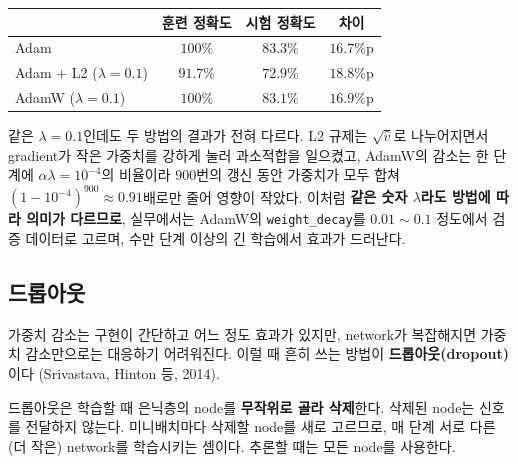 \documentclass[11pt,a4paper]{article}
\begin{document}
\begin{center}
\begin{tabular}{@{}lccc@{}}
\toprule
& 훈련 정확도 & 시험 정확도 & 차이 \\
\midrule
Adam & $100\%$ & $83.3\%$ & $16.7\%$p \\
Adam $+$ L2 ($\lambda=0.1$) & $91.7\%$ & $72.9\%$ & $18.8\%$p \\
AdamW ($\lambda=0.1$) & $100\%$ & $83.1\%$ & $16.9\%$p \\
\bottomrule
\end{tabular}
\end{center}
같은 $\lambda=0.1$인데도 두 방법의 결과가 전혀 다르다.
L2 규제는 $\sqrt{\hat v}$로 나누어지면서 gradient가 작은 가중치를 강하게 눌러 과소적합을 일으켰고,
AdamW의 감소는 한 단계에 $\alpha\lambda=10^{-4}$의 비율이라 $900$번의 갱신 동안
가중치가 모두 합쳐 $(1-10^{-4})^{900}\approx0.91$배로만 줄어 영향이 작았다.
이처럼 \textbf{같은 숫자 $\lambda$라도 방법에 따라 의미가 다르므로}, 실무에서는 AdamW의 \texttt{weight\_decay}를
$0.01\sim0.1$ 정도에서 검증 데이터로 고르며, 수만 단계 이상의 긴 학습에서 효과가 드러난다.

\subsection{드롭아웃}\label{sec:dropout}

가중치 감소는 구현이 간단하고 어느 정도 효과가 있지만,
network가 복잡해지면 가중치 감소만으로는 대응하기 어려워진다.
이럴 때 흔히 쓰는 방법이 \textbf{드롭아웃(dropout)}이다 (Srivastava, Hinton 등, 2014).

드롭아웃은 학습할 때 은닉층의 node를 \textbf{무작위로 골라 삭제}한다.
삭제된 node는 신호를 전달하지 않는다.
미니배치마다 삭제할 node를 새로 고르므로, 매 단계 서로 다른 (더 작은) network를 학습시키는 셈이다.
추론할 때는 모든 node를 사용한다.
\end{document}
